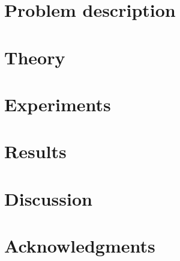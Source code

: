 \section{Problem description}
    \label{sec:problem}
    

\section{Theory}
    \label{sec:theory}
%    

\section{Experiments}
    \label{sec:experiments}

\section{Results}
    \label{sec:results}
%    

\section{Discussion}
    \label{sec:discussion}

\section{Acknowledgments}
    \label{sec:acknowledgments}
